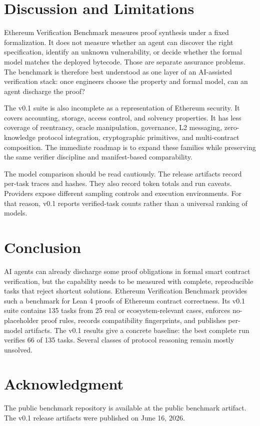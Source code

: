 \documentclass[conference]{IEEEtran}
\newif\ifanonymous
\newcommand{\toolname}{Ethereum Verification Benchmark}
\newcommand{\lean}{Lean 4}
\newcommand{\repoanon}{the public benchmark artifact}
\newcommand{\artifactrepo}{\repoanon}
\newcommand{\artifactrepo}{\url{https://github.com/lfglabs-dev/ethereum-verification-benchmark}}
\begin{document}
\section{Discussion and Limitations}

\toolname{} measures proof synthesis under a fixed formalization. It does not
measure whether an agent can discover the right specification, identify an
unknown vulnerability, or decide whether the formal model matches the deployed
bytecode. Those are separate assurance problems. The benchmark is therefore best
understood as one layer of an AI-assisted verification stack: once engineers
choose the property and formal model, can an agent discharge the proof?

The v0.1 suite is also incomplete as a representation of Ethereum security.
It covers accounting, storage, access control, and solvency properties. It has
less coverage of reentrancy, oracle manipulation, governance, L2 messaging,
zero-knowledge protocol integration, cryptographic primitives, and
multi-contract composition. The immediate roadmap is to expand these families
while preserving the same verifier discipline and manifest-based comparability.

The model comparison should be read cautiously. The release artifacts record
per-task traces and hashes. They also record token totals and run caveats.
Providers expose different sampling controls and execution environments. For
that reason, v0.1 reports verified-task counts rather than a universal ranking
of models.

\section{Conclusion}

AI agents can already discharge some proof obligations in formal smart contract
verification, but the capability needs to be measured with complete,
reproducible tasks that reject shortcut solutions. \toolname{} provides such a
benchmark for \lean{} proofs of Ethereum contract correctness. Its v0.1 suite
contains 135 tasks from 25 real or ecosystem-relevant cases, enforces
no-placeholder proof rules, records compatibility fingerprints, and publishes
per-model artifacts. The v0.1 results give a concrete baseline: the best
complete run verifies 66 of 135 tasks. Several classes of protocol reasoning
remain mostly unsolved.

\ifanonymous
\else
\section*{Acknowledgment}
The public benchmark repository is available at \artifactrepo. The v0.1 release
artifacts were published on June 16, 2026.
\fi



\end{document}
